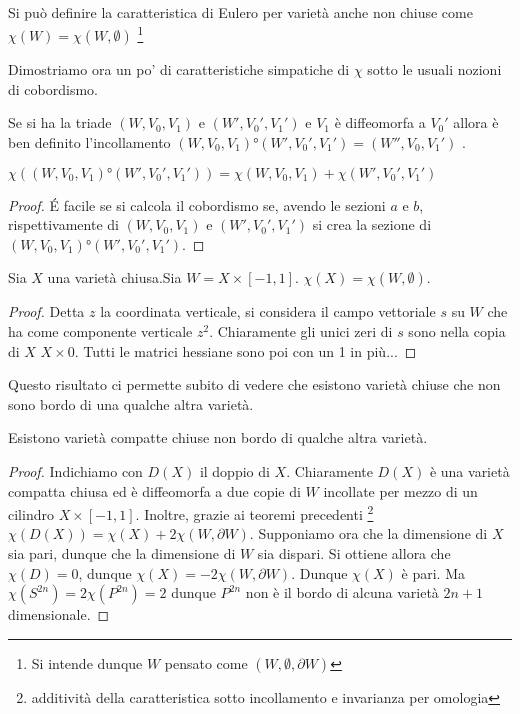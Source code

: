 \begin{defn}
Si può definire la caratteristica di Eulero per varietà anche non chiuse come $\chi(W)=\chi(W, \emptyset)$
\footnote{Si intende dunque $W$ pensato come $(W,\emptyset, \partial W)$}
\end{defn}

Dimostriamo ora un po' di caratteristiche simpatiche di $\chi$ sotto le usuali nozioni di cobordismo.

\begin{defn}
Se si ha la triade $(W, V_0, V_1)$ e $(W', V_0', V_1')$ e $V_1$ è diffeomorfa a $V_0'$ allora è ben definito l'incollamento $(W, V_0, V_1)°(W', V_0', V_1')=(W'', V_0, V_1')$ .
\end{defn}
\begin{teo}
$\chi((W, V_0, V_1)°(W', V_0', V_1'))=\chi(W, V_0, V_1)+\chi(W', V_0', V_1')$
\end{teo}
\begin{proof}
\'E facile se si calcola il cobordismo se, avendo le sezioni $a$ e $b$, rispettivamente di $(W, V_0, V_1)$ e $(W', V_0', V_1')$ si crea la sezione di $(W, V_0, V_1)°(W', V_0', V_1')$.
\end{proof}

\begin{teo}
Sia $X$ una varietà chiusa.Sia $W=X\times [-1,1]$. $\chi(X)=\chi(W, \emptyset)$.   
\end{teo}
\begin{proof}
Detta $z$ la coordinata verticale, si considera il campo vettoriale $s$ su $W$ che ha come componente verticale $z^2$. Chiaramente gli unici zeri di $s$ sono nella copia di $X$ $X\times{0}$. Tutti le matrici hessiane sono poi con un 1 in più...
\end{proof}

Questo risultato ci permette subito di vedere che esistono varietà chiuse che non sono bordo di una qualche altra varietà.
\begin{teo}
Esistono varietà compatte chiuse non bordo di qualche altra varietà.%
\end{teo}
\begin{proof}
Indichiamo con $D(X)$ il doppio di $X$. Chiaramente $D(X)$ è una varietà compatta chiusa ed è diffeomorfa a due copie di $W$ incollate per mezzo di un cilindro $X\times [-1, 1]$. Inoltre, grazie ai teoremi precedenti \footnote{additività della caratteristica sotto incollamento e invarianza per omologia} $\chi(D(X))=\chi(X)+2\chi(W, \partial W)$. Supponiamo ora che la dimensione di $X$ sia pari, dunque che la dimensione di $W$ sia dispari. Si ottiene allora che $\chi(D)=0$, dunque $\chi(X)=-2\chi(W, \partial W)$. Dunque $\chi(X)$ è pari. Ma $\chi(S^{2n})=2\chi(P^{2n})=2$ dunque $P^{2n}$ non è il bordo di alcuna varietà $2n+1$ dimensionale. 
\end{proof}

